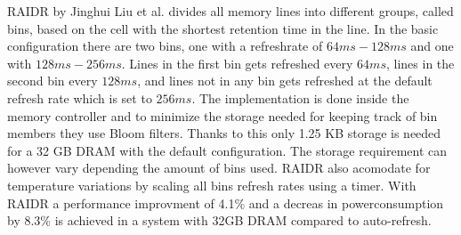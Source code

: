 RAIDR by Jinghui Liu et al. \cite{raidr} divides all memory lines into different groups, called bins, based on the cell with the shortest retention time in the line. In the basic configuration there are two bins, one with a refreshrate of \(64ms - 128ms\) and one with \(128ms - 256ms\). Lines in the first bin gets refreshed every \(64ms\), lines in the second bin every \(128ms\), and lines not in any bin gets refreshed at the default refresh rate which is set to \(256ms\). The implementation is done inside the memory controller and to minimize the storage needed for keeping track of bin members they use Bloom filters. Thanks to this only 1.25 KB storage is needed for a 32 GB DRAM with the default configuration. The storage requirement can however vary depending the amount of bins used. RAIDR also acomodate for temperature variations by scaling all bins refresh rates using a timer. With RAIDR a performance improvment of 4.1\% and a decreas in powerconsumption by 8.3\% is achieved in a system with 32GB DRAM compared to auto-refresh.